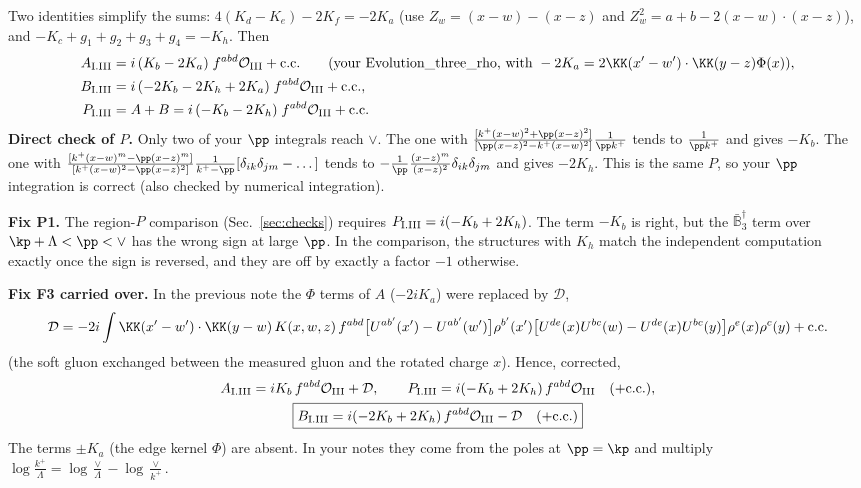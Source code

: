 Two identities simplify the sums: $4(K_d-K_e)-2K_f=-2K_a$ (use $Z_w=(x-w)-(x-z)$ and $Z_w^2=a+b-2(x-w)\cdot(x-z)$), and $-K_c+g_1+g_2+g_3+g_4=-K_h$. Then
\begin{align}
A_{\rm I.III}&=i\,(K_b-2K_a)\;f^{abd}\mathcal O_{\rm III}+{\rm c.c.}\qquad\text{(your Evolution\_three\_rho, with }-2K_a=2\KK(x'-w')\cdot\KK(y-z)\Phi(x)),\notag\\
B_{\rm I.III}&=i\,(-2K_b-2K_h+2K_a)\;f^{abd}\mathcal O_{\rm III}+{\rm c.c.},\notag\\
P_{\rm I.III}&=A+B=i\,(-K_b-2K_h)\;f^{abd}\mathcal O_{\rm III}+{\rm c.c.}
\end{align}
\textbf{Direct check of $P$.} Only two of your $\pp$ integrals reach $\vee$. The one with $\frac{[k^+(x-w)^2+\pp(x-z)^2]}{[\pp(x-z)^2-k^+(x-w)^2]}\frac{1}{\pp k^+}$ tends to $\frac{1}{\pp k^+}$ and gives $-K_b$. The one with $\frac{[k^+(x-w)^m-\pp(x-z)^m]}{[k^+(x-w)^2-\pp(x-z)^2]}\frac{1}{k^+-\pp}[\delta_{ik}\delta_{jm}-\dots]$ tends to $-\frac{1}{\pp}\frac{(x-z)^m}{(x-z)^2}\delta_{ik}\delta_{jm}$ and gives $-2K_h$. This is the same $P$, so your $\pp$ integration is correct (also checked by numerical integration).

\textbf{Fix P1.} The region-$P$ comparison (Sec.~\ref{sec:checks}) requires $P_{\rm I.III}=i(-K_b+2K_h)$. The term $-K_b$ is right, but the $\bar{\mathbb B}_3^\dagger$ term over $\kp+\Lambda<\pp<\vee$ has the wrong sign at large $\pp$. In the comparison, the structures with $K_h$ match the independent computation exactly once the sign is reversed, and they are off by exactly a factor $-1$ otherwise.

\textbf{Fix F3 carried over.} In the previous note the $\Phi$ terms of $A$ ($-2iK_a$) were replaced by $\mathcal D$,
\[
\mathcal D=-2i\int\KK(x'-w')\cdot\KK(y-w)\,K(x,w,z)\,f^{abd}\big[U^{ab'}(x')-U^{ab'}(w')\big]\rho^{b'}(x')\big[U^{de}(x)U^{bc}(w)-U^{de}(x)U^{bc}(y)\big]\rho^e(x)\rho^c(y)+{\rm c.c.}
\]
(the soft gluon exchanged between the measured gluon and the rotated charge $x$). Hence, corrected,
\begin{gather}
A_{\rm I.III}=iK_b\,f^{abd}\mathcal O_{\rm III}+\mathcal D,\qquad P_{\rm I.III}=i(-K_b+2K_h)\,f^{abd}\mathcal O_{\rm III}\quad(+{\rm c.c.}),\notag\\
\boxed{B_{\rm I.III}=i(-2K_b+2K_h)\,f^{abd}\mathcal O_{\rm III}-\mathcal D\quad(+{\rm c.c.})}
\end{gather}
The terms $\pm K_a$ (the edge kernel $\Phi$) are absent. In your notes they come from the poles at $\pp=\kp$ and multiply $\log\frac{k^+}{\Lambda}=\log\frac{\vee}{\Lambda}-\log\frac{\vee}{k^+}$.

